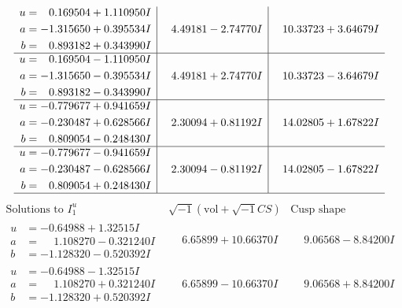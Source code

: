 \documentclass[1p]{elsarticle_modified}
\theoremstyle{definition}
\newcommand{\I}{\sqrt{-1}}
\begin{document}
$$\begin{array}{c|c|c}
\begin{aligned}
u &= \phantom{-}0.169504 + 1.110950 I \\
a &= -1.315650 + 0.395534 I \\
b &= \phantom{-}0.893182 + 0.343990 I\end{aligned}
 & \phantom{-}4.49181 - 2.74770 I & \phantom{-}10.33723 + 3.64679 I \\ \hline\begin{aligned}
u &= \phantom{-}0.169504 - 1.110950 I \\
a &= -1.315650 - 0.395534 I \\
b &= \phantom{-}0.893182 - 0.343990 I\end{aligned}
 & \phantom{-}4.49181 + 2.74770 I & \phantom{-}10.33723 - 3.64679 I \\ \hline\begin{aligned}
u &= -0.779677 + 0.941659 I \\
a &= -0.230487 + 0.628566 I \\
b &= \phantom{-}0.809054 - 0.248430 I\end{aligned}
 & \phantom{-}2.30094 + 0.81192 I & \phantom{-}14.02805 + 1.67822 I \\ \hline\begin{aligned}
u &= -0.779677 - 0.941659 I \\
a &= -0.230487 - 0.628566 I \\
b &= \phantom{-}0.809054 + 0.248430 I\end{aligned}
 & \phantom{-}2.30094 - 0.81192 I & \phantom{-}14.02805 - 1.67822 I\\
 \hline 
 \end{array}$$\newpage$$\begin{array}{c|c|c}  
\text{Solutions to }I^u_{1}& \I (\text{vol} + \sqrt{-1}CS) & \text{Cusp shape}\\
 \hline 
\begin{aligned}
u &= -0.64988 + 1.32515 I \\
a &= \phantom{-}1.108270 - 0.321240 I \\
b &= -1.128320 - 0.520392 I\end{aligned}
 & \phantom{-}6.65899 + 10.66370 I & \phantom{-}9.06568 - 8.84200 I \\ \hline\begin{aligned}
u &= -0.64988 - 1.32515 I \\
a &= \phantom{-}1.108270 + 0.321240 I \\
b &= -1.128320 + 0.520392 I\end{aligned}
 & \phantom{-}6.65899 - 10.66370 I & \phantom{-}9.06568 + 8.84200 I \\ \hline\begin{aligned}

\end{aligned}
\end{array}$$
\end{document}
